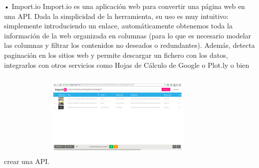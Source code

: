 \documentclass[twoside,twocolumn]{article}
\begin{document}
•	Import.io 
\newline
Import.io es una aplicación web para convertir una página web en una API. Dada la simplicidad de la herramienta, su uso es muy intuitivo: simplemente introduciendo un enlace, automáticamente obtenemos toda la información de la web organizada en columnas (para lo que es necesario modelar las columnas y filtrar los contenidos no deseados o redundantes). Además, detecta paginación en los sitios web y permite descargar un fichero con los datos, integrarlos con otros servicios como Hojas de Cálculo de Google o Plot.ly o bien crear una API.
\newline
\newline
\includegraphics[width=7cm, height=5cm]{Image/bdimage.png}
\newline
\newline
\end{document}
